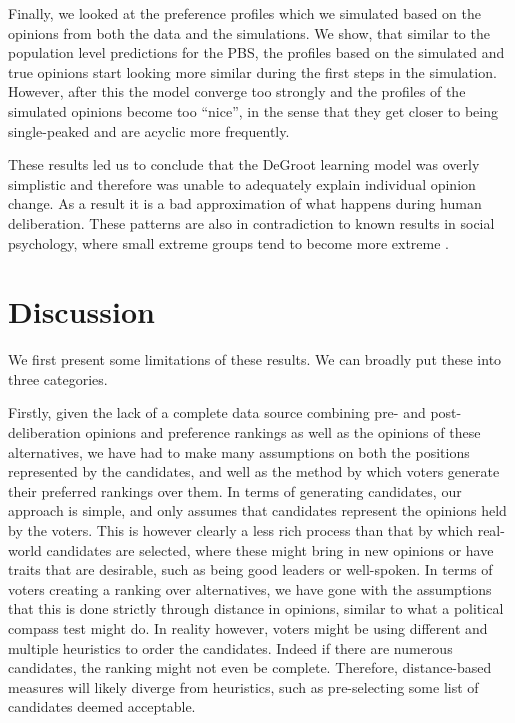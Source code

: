 Finally, we looked at the preference profiles which we simulated based on the
opinions from both the data and the simulations. We show, that similar to the
population level predictions for the PBS, the profiles based on the simulated
and true opinions start looking more similar during the first steps in the
simulation. However, after this the model converge too strongly and the
profiles of the simulated opinions become too ``nice'', in the sense that they
get closer to being single-peaked and are acyclic more frequently.

These results led us to conclude that the DeGroot learning model was overly
simplistic and therefore was unable to adequately explain individual opinion
change. As a result it is a bad approximation of what happens during human
deliberation. These patterns are also in contradiction to known results in
social psychology, where small extreme groups tend to become more extreme \cite{myersPolarizingEffectGroup1975}.

\section{Discussion}

We first present some limitations of these results. We can broadly put these
into three categories.

Firstly, given the lack of a complete data source combining pre- and
post-deliberation opinions and preference rankings as well as the opinions of
these alternatives, we have had to make many assumptions on both the positions
represented by the candidates, and well as the method by which voters generate
their preferred rankings over them. In terms of generating candidates, our
approach is simple, and only assumes that candidates represent the opinions held
by the voters. This is however clearly a less rich process than that by which
real-world candidates are selected, where these might bring in new opinions or
have traits that are desirable, such as being good leaders or well-spoken. In
terms of voters creating a ranking over alternatives, we have gone with the
assumptions that this is done strictly through distance in opinions, similar to
what a political compass test might do. In reality however, voters might be
using different and multiple heuristics to order the candidates. Indeed if
there are numerous candidates, the ranking might not even be complete.
Therefore, distance-based measures will likely diverge from heuristics, such as
pre-selecting some list of candidates deemed acceptable.


